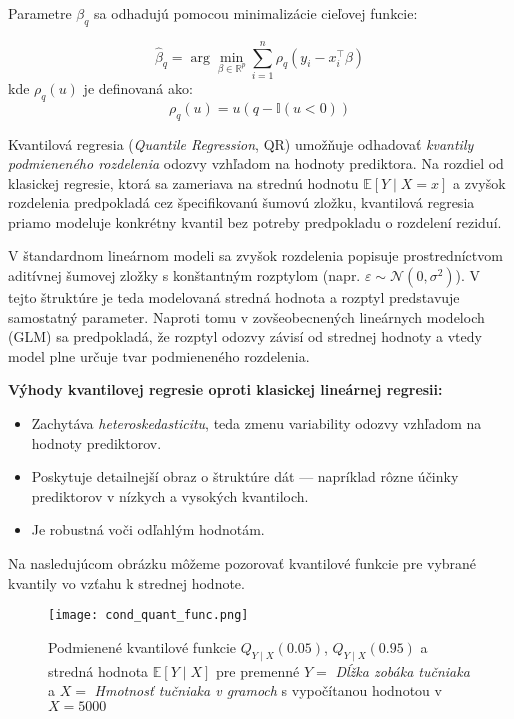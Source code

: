 Parametre $\beta_q$ sa odhadujú pomocou minimalizácie cieľovej funkcie:

\begin{equation}
\hat{\beta}_q = \arg\min_{\beta \in \mathbb{R}^p} \sum_{i=1}^n \rho_q (y_i - x_i^\top \beta)
\end{equation}
kde $\rho_q(u)$ je definovaná ako:
\begin{equation}
\rho_q(u) = u(q - \mathbb{I}(u < 0))
\end{equation}

Kvantilová regresia (\textit{Quantile Regression}, QR) umožňuje odhadovať \textit{kvantily podmieneného rozdelenia} odozvy vzhľadom na hodnoty prediktora. Na rozdiel od klasickej regresie, ktorá sa zameriava na strednú hodnotu $\mathbb{E}[Y \mid X = x]$ a zvyšok rozdelenia predpokladá cez špecifikovanú šumovú zložku, kvantilová regresia priamo modeluje konkrétny kvantil bez potreby predpokladu o rozdelení reziduí.

V štandardnom lineárnom modeli sa zvyšok rozdelenia popisuje prostredníctvom aditívnej šumovej zložky s konštantným rozptylom (napr. $\varepsilon \sim \mathcal{N}(0, \sigma^2)$). V tejto štruktúre je teda modelovaná stredná hodnota a rozptyl predstavuje samostatný parameter. Naproti tomu v zovšeobecnených lineárnych modeloch (GLM) sa predpokladá, že rozptyl odozvy závisí od strednej hodnoty a vtedy model plne určuje tvar podmieneného rozdelenia.

\bigskip
\textbf{Výhody kvantilovej regresie oproti klasickej lineárnej regresii:}
\begin{itemize}
  \item Zachytáva \textit{heteroskedasticitu}, teda zmenu variability odozvy vzhľadom na hodnoty prediktorov.
  \item Poskytuje detailnejší obraz o štruktúre dát — napríklad rôzne účinky prediktorov v nízkych a vysokých kvantiloch.
  \item Je robustná voči odľahlým hodnotám.
\end{itemize}

Na nasledujúcom obrázku môžeme pozorovať kvantilové funkcie pre vybrané kvantily vo vzťahu k strednej hodnote.

\begin{figure}[H]
    \centering
    \texttt{[image: cond\_quant\_func.png]}
    \caption{Podmienené kvantilové funkcie $Q_{Y \mid X}(0.05)$, $Q_{Y \mid X}(0.95)$ a stredná hodnota $\mathbb{E}[Y \mid X]$ pre premenné $Y=$ \textit{Dĺžka zobáka tučniaka} a $X=$ \textit{Hmotnosť tučniaka v gramoch} s vypočítanou hodnotou v $X=5000$}
    \label{fig:cond_quant_mean}
\end{figure}

